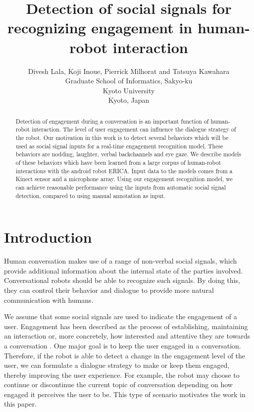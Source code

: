\documentclass[letterpaper]{article} %
\begin{document}
%
\title{Detection of social signals for recognizing engagement in human-robot interaction}
\author{Divesh Lala, Koji Inoue, Pierrick Milhorat and Tatsuya Kawahara\\
Graduate School of Informatics, Sakyo-ku\\
Kyoto University\\
Kyoto, Japan\\
}
\maketitle
\begin{abstract}
Detection of engagement during a conversation is an important function of human-robot interaction. The level of user engagement can influence the dialogue strategy of the robot. Our motivation in this work is to detect several behaviors which will be used as social signal inputs for a real-time engagement recognition model. These behaviors are nodding, laughter, verbal backchannels and eye gaze. We describe models of these behaviors which have been learned from a large corpus of human-robot interactions with the android robot ERICA. Input data to the models comes from a Kinect sensor and a microphone array. Using our engagement recognition model, we can achieve reasonable performance using the inputs from automatic social signal detection, compared to using manual annotation as input.
\end{abstract}

\section{Introduction}
Human conversation makes use of a range of non-verbal social signals, which provide additional information about the internal state of the parties involved. Conversational robots should be able to recognize such signals. By doing this, they can control their behavior and dialogue to provide more natural communication with humans.

We assume that some social signals are used to indicate the engagement of a user. Engagement has been described as the process of establishing, maintaining an interaction \cite{Sidner2005} or, more concretely, how interested and attentive they are towards a conversation \cite{Yu2004}. One major goal is to keep the user engaged in a conversation. Therefore, if the robot is able to detect a change in the engagement level of the user, we can formulate a dialogue strategy to make or keep them engaged, thereby improving the user experience. For example, the robot may choose to continue or discontinue the current topic of conversation depending on how engaged it perceives the user to be. This type of scenario motivates the work in this paper.
\end{document}

